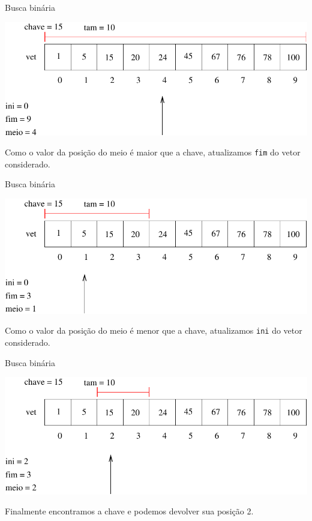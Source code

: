 \documentclass[handout]{beamer}
\newcommand{\cod}[1]{\texttt{#1}}
\begin{document}
\begin{frame}[fragile]{Busca binária}

    \begin{center}
        \includegraphics[scale=0.7]{buscaBin}
    \end{center}

    Como o valor da posição do meio é maior que a chave, atualizamos \cod{fim} do vetor considerado.

\end{frame}

\begin{frame}[fragile]{Busca binária}

    \begin{center}
        \includegraphics[scale=0.7]{buscaBin2}
    \end{center}

    Como o valor da posição do meio é menor que a chave, atualizamos \cod{ini} do vetor considerado.

\end{frame}

\begin{frame}[fragile]{Busca binária}

    \begin{center}
        \includegraphics[scale=0.7]{buscaBin3}
    \end{center}

    Finalmente encontramos a chave e podemos devolver sua posição 2.

\end{frame}
\end{document}
